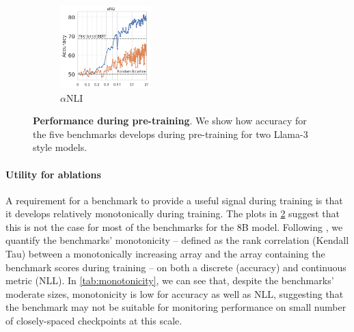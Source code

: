 \begin{figure}[t]
\begin{subfigure}[b]{0.19\textwidth}
    \centering
    \includegraphics[height=3.2cm, trim=11mm 0 0 0, clip]{figures/abductivenli_intermediate}
    \caption{$\alpha$NLI}
    \label{fig:alphanli_int}
    \end{subfigure}
    \caption{\textbf{Performance during pre-training}. 
    We show how accuracy for the five benchmarks develops during pre-training for two Llama-3 style models.}\label{fig:performance_training}
\end{figure}

\begin{table}
\centering
{}
    \caption{\textbf{Monotonicity values during the course of training.} We report monotonicity both for accuracy ($mon_{Acc}$) and negative log likelihood of the correct answer ($mon_{NLL}$).}
\label{tab:monotonicity}
\end{table}

\paragraph{Utility for ablations}
A requirement for a benchmark to provide a useful signal during training is that it develops relatively monotonically during training.
The plots in \cref{fig:performance_training} suggest that this is not the case for most of the benchmarks for the 8B model.
Following \citet{variancepaper}, we quantify the benchmarks' monotonicity -- defined as the rank correlation (Kendall Tau) between a monotonically increasing array and the array containing the benchmark scores during training -- on both a discrete (accuracy) and continuous metric (NLL). 
In \cref{tab:monotonicity}, we can see that, despite the benchmarks' moderate sizes, monotonicity is low for accuracy as well as NLL, suggesting that the benchmark may not be suitable for monitoring performance on small number of closely-spaced checkpoints at this scale. 

